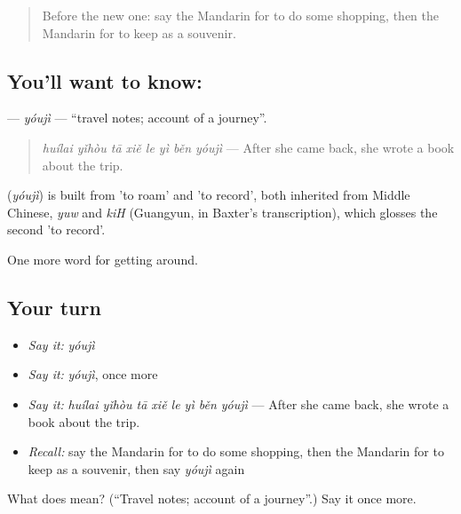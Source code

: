 \label{lesson:ZH-C434-youji}



\begin{quote}
Before the new one: say the Mandarin for to do some shopping, then the Mandarin for to keep as a souvenir.
\end{quote}

\subsection*{You'll want to know: }
\textbf{} — \emph{yóujì} — \textquotedblleft{}travel notes; account of a journey\textquotedblright{}.

\begin{quote}
\emph{huílai yǐhòu tā xiě le yì běn yóujì} — After she came back, she wrote a book about the trip.
\end{quote}

\begin{cousinweb}
\textbf{} (\emph{yóujì}) is built from  'to roam' and  'to record', both inherited from Middle Chinese, \emph{yuw} and \emph{kiH} (Guangyun, in Baxter's transcription), which glosses the second 'to record'.
\end{cousinweb}

\begin{grammarlens}[title={What you've built}]
One more word for getting around.
\end{grammarlens}

\subsection*{Your turn}
\begin{itemize}
\raggedright
  \item \emph{Say it:} \emph{yóujì}
  \item \emph{Say it:} \emph{yóujì}, once more
  \item \emph{Say it:} \emph{huílai yǐhòu tā xiě le yì běn yóujì} — After she came back, she wrote a book about the trip.
  \item \emph{Recall:} say the Mandarin for to do some shopping, then the Mandarin for to keep as a souvenir, then say \emph{yóujì} again
\end{itemize}

\begin{tcolorbox}[breakable,colback=teal!4,colframe=teal!35!black,title={Before you move on}]
What does  mean? (\textquotedblleft{}Travel notes; account of a journey\textquotedblright{}.) Say it once more.
\end{tcolorbox}
